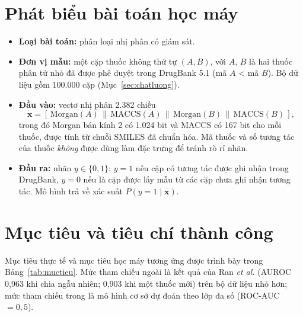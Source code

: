 \documentclass[12pt,a4paper,oneside]{report}
\begin{document}
\section{Phát biểu bài toán học máy}
\begin{itemize}
  \item \textbf{Loại bài toán:} phân loại nhị phân có giám sát.
  \item \textbf{Đơn vị mẫu:} một cặp thuốc không thứ tự $(A, B)$, với $A$, $B$ là hai
        thuốc phân tử nhỏ đã được phê duyệt trong DrugBank 5.1 (mã $A$ < mã $B$).
        Bộ dữ liệu gồm 100.000 cặp (Mục~\ref{sec:chatluong}).
  \item \textbf{Đầu vào:} vectơ nhị phân 2.382 chiều
        \[\mathbf{x} = [\,\text{Morgan}(A)\,\|\,\text{MACCS}(A)\,\|\,\text{Morgan}(B)\,\|\,\text{MACCS}(B)\,],\]
        trong đó Morgan bán kính 2 có 1.024 bit và MACCS có 167 bit cho mỗi thuốc,
        được tính từ chuỗi SMILES đã chuẩn hóa. Mã thuốc và số tương tác của
        thuốc \emph{không} được dùng làm đặc trưng để tránh rò rỉ nhãn.
  \item \textbf{Đầu ra:} nhãn $y\in\{0,1\}$: $y=1$ nếu cặp có tương tác được ghi
        nhận trong DrugBank, $y=0$ nếu là cặp được lấy mẫu từ các cặp chưa ghi
        nhận tương tác. Mô hình trả về xác suất $P(y=1\mid\mathbf{x})$.
\end{itemize}

\section{Mục tiêu và tiêu chí thành công}
Mục tiêu thực tế và mục tiêu học máy tương ứng được trình bày trong
Bảng~\ref{tab:muctieu}. Mức tham chiếu ngoài là kết quả của Ran \textit{et al.}
\cite{ran2022} (AUROC 0,963 khi chia ngẫu nhiên; 0,903 khi một thuốc mới) trên
bộ dữ liệu nhỏ hơn; mức tham chiếu trong là mô hình cơ sở dự đoán theo lớp đa số
(ROC-AUC $=0{,}5$).
\end{document}

